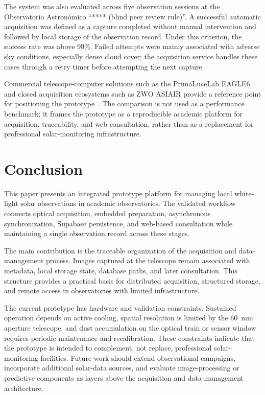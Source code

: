 \documentclass[conference,a4paper]{IEEEtran}
\begin{document}
The system was also evaluated across five observation sessions at the Observatorio Astron\'omico ``**** (blind peer review rule)''. A successful automatic acquisition was defined as a capture completed without manual intervention and followed by local storage of the observation record. Under this criterion, the success rate was above 90\%. Failed attempts were mainly associated with adverse sky conditions, especially dense cloud cover; the acquisition service handles these cases through a retry timer before attempting the next capture.

Commercial telescope-computer solutions such as the PrimaLuceLab EAGLE6 and closed acquisition ecosystems such as ZWO ASIAIR provide a reference point for positioning the prototype~\cite{primaluceEagle62026,zwoASIAIR2026}. The comparison is not used as a performance benchmark; it frames the prototype as a reproducible academic platform for acquisition, traceability, and web consultation, rather than as a replacement for professional solar-monitoring infrastructure.

\section{Conclusion}

This paper presents an integrated prototype platform for managing local white-light solar observations in academic observatories. The validated workflow connects optical acquisition, embedded preparation, asynchronous synchronization, Supabase persistence, and web-based consultation while maintaining a single observation record across these stages.

The main contribution is the traceable organization of the acquisition and data-management process. Images captured at the telescope remain associated with metadata, local storage state, database paths, and later consultation. This structure provides a practical basis for distributed acquisition, structured storage, and remote access in observatories with limited infrastructure.

The current prototype has hardware and validation constraints. Sustained operation depends on active cooling, spatial resolution is limited by the 60~mm aperture telescope, and dust accumulation on the optical train or sensor window requires periodic maintenance and recalibration. These constraints indicate that the prototype is intended to complement, not replace, professional solar-monitoring facilities. Future work should extend observational campaigns, incorporate additional solar-data sources, and evaluate image-processing or predictive components as layers above the acquisition and data-management architecture.




\end{document}
